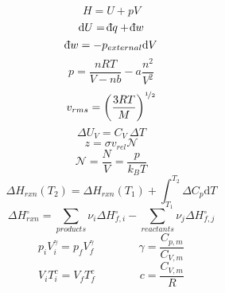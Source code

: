 \documentclass[12pt, letterpaper]{memoir}
\begin{document}
\noindent
\begin{minipage}{0.5\linewidth}
	\begin{equation*}
		H = U + pV
	\end{equation*}	
	\begin{equation*}
		\mathrm{d} U = \dbar q + \dbar w
	\end{equation*}	
	\begin{equation*}
		\dbar w = -p_{external} \mathrm{d}V
	\end{equation*}	
	\begin{equation*}
		p = \frac{nRT}{V-nb} - a\frac{n^2}{V^2}
	\end{equation*}
	\begin{equation*}
		v_{rms} = \left(\frac{3RT}{M}\right)^{\nicefrac{1}{2}}
	\end{equation*}
	\begin{equation*}
		\Delta U_V = C_V~\Delta T
	\end{equation*}	
	\begin{equation*}
		z = \sigma v_{rel}\mathcal{N}
	\end{equation*}
	\begin{equation*}
		\mathcal{N} = \frac{N}{V}=\frac{p}{k_BT}
	\end{equation*}
	\begin{equation*}
		\Delta H_{rxn}(T_2) = \Delta H_{rxn}(T_1) + \int_{T_1}^{T_2} \! \Delta C_{p}\mathrm{d}T
	\end{equation*}
	\begin{equation*}
	\Delta H^\circ_{rxn} = \sum\limits_{products} \nu_i\Delta H^\circ_{f,i} - \sum\limits_{reactants} \nu_j\Delta H^\circ_{f,j}
	\end{equation*}
	\begin{equation*}
		p_iV_i^\gamma = p_fV_f^\gamma \hspace{4em} \gamma = \dfrac{C_{p,m}}{C_{V,m}}
	\end{equation*}
	\begin{equation*}
		V_iT_i^c=V_fT_f^c \hspace{4em} c=\dfrac{C_{V,m}}{R}
	\end{equation*}
\end{minipage}
\end{document}
